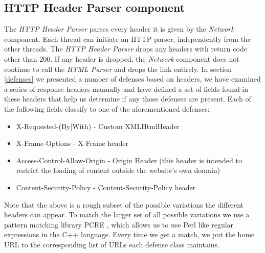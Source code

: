 \subsection{HTTP Header Parser component}
The \emph{HTTP Header Parser} parses every header it is given by the \emph{Network} component.  Each thread can 
initiate an HTTP parser, independently from the other threads.  The \emph{HTTP Header Parser} drops any headers
with return code other than 200.  If any header is dropped, the \emph{Network} component does not continue to call
the \emph{HTML Parser} and drops the link entirely.
In section \ref{defenses} we presented a number of defenses based on headers,
we have examined a series of response headers manually and have defined a set of fields found in these headers
that help us determine if any those defenses are present.  Each of the following fields classify to one of the 
aforementioned defenses: 
\begin{itemize}
	\item X-Requested-(By|With) - Custom XMLHtmlHeader
	\item X-Frame-Options - X-Frame header
	\item Access-Control-Allow-Origin - Origin Header (this header is intended to restrict the loading of content outside
	the website's own domain)
	\item Content-Security-Policy - Content-Security-Policy header
\end{itemize}
Note that the above is a rough subset of the possible variations the different headers can appear.  To match the larger
set of all possible variations we use a pattern matching library PCRE \cite{website:pcre}, 
which allows us to use Perl like regular expressions in the C++ language. Every time we get a match, 
we put the home URL to the corresponding list of URLs each defense class maintains.

